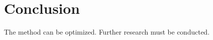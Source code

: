 \documentclass[runningheads, orivec]{llncs}
\begin{document}
\section{Conclusion}

The method can be optimized. Further research must be conducted.
%
%
%


%
\end{document}
